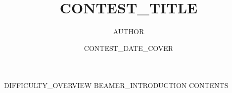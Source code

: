 \documentclass[aspectratio=43,UTF8,12pt,fontset=none]{ctexbeamer}
\title{ {{CONTEST_TITLE}} }
\author{ {{AUTHOR}} }
\date{ {{CONTEST_DATE_COVER}} }
\begin{document}
\begin{frame}\titlepage\end{frame}
{{DIFFICULTY_OVERVIEW}}
{{BEAMER_INTRODUCTION}}
{{CONTENTS}}
\end{document}
